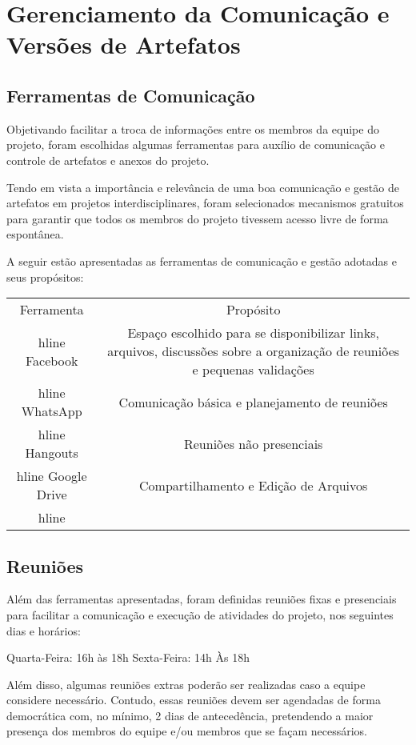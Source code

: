 \chapter[Gerenciamento da Comunicação e Versões de Artefatos]{Gerenciamento da Comunicação e Versões de Artefatos}
\section{Ferramentas de Comunicação}
Objetivando facilitar a troca de informações entre os membros da equipe do projeto, foram escolhidas algumas ferramentas para auxílio de comunicação e controle de artefatos e anexos do projeto. 

Tendo em vista a importância e relevância de uma boa comunicação e gestão de artefatos em projetos interdisciplinares, foram selecionados mecanismos gratuitos para garantir que todos os membros do projeto tivessem acesso livre de forma espontânea.

A seguir estão apresentadas as ferramentas de comunicação e gestão adotadas e seus propósitos: 

\begin{table}[h]
\centering
\begin{tabular}{|c|c|} \hline

Ferramenta & Propósito \\hline
Facebook & Espaço escolhido para se disponibilizar  links,  arquivos, discussões sobre a organização de reuniões e pequenas validações \\hline
WhatsApp & Comunicação básica e planejamento de reuniões \\hline
Hangouts & Reuniões não presenciais \\hline
Google Drive & Compartilhamento e Edição de Arquivos \\hline
\end{tabular}
\end{table}
\section{Reuniões}
Além das ferramentas apresentadas, foram definidas reuniões fixas e presenciais para facilitar a comunicação e execução de atividades do projeto, nos seguintes dias e horários:

Quarta-Feira: 16h às 18h 
Sexta-Feira: 14h Às 18h 

Além disso, algumas reuniões extras poderão ser realizadas caso a equipe considere necessário. Contudo, essas reuniões devem ser agendadas de forma democrática com, no mínimo, 2 dias de antecedência, pretendendo a maior presença dos membros do equipe e/ou membros que se façam necessários.
